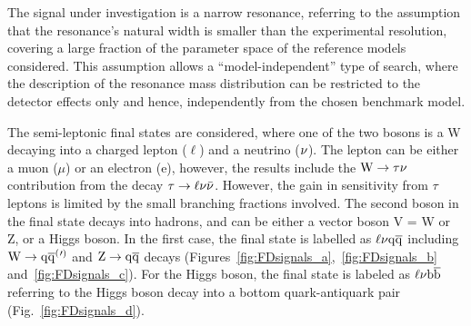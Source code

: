 \begin{table}[!htb]
\centering
\caption{Summary of the properties of the heavy resonance models considered in this work. The polarization of the produced W/Z boson in all considered models is mostly longitudinal.}
\label{tab:models}
\end{table}

The signal under investigation is a narrow resonance, referring to the assumption
that the resonance's natural width is smaller than the experimental resolution, covering a large fraction of the parameter space of the reference models considered.
This assumption allows a ``model-independent'' type of search, where the description of the resonance mass distribution can be restricted to the detector effects only and hence,
independently from the chosen benchmark model.

The semi-leptonic final states are considered, where one of the two bosons is a W decaying into a charged lepton ($\ell$) and a neutrino ($\nu$).
The lepton can be either a muon ($\mu$) or an electron (e), however, the results include the $\mathrm{W}\to\tau\nu$ contribution from the decay $\tau\to\ell\nu\bar{\nu}$.
However, the gain in sensitivity from $\tau$ leptons is limited by the small branching fractions involved.
The second boson in the final state decays into hadrons, and can be either a vector boson V = W or Z,
or a Higgs boson. In the first case, the final state is labelled as $\ell\nu\mathrm{q}\overline{\mathrm{q}}$ including $\mathrm{W}\to\mathrm{q}\overline{\mathrm{q}}^({}'^){}$ and $\mathrm{Z}\to\mathrm{q}\overline{\mathrm{q}}$ decays (Figures~\ref{fig:FDsignals_a},~\ref{fig:FDsignals_b} and~\ref{fig:FDsignals_c}).
For the Higgs boson, the final state is labeled as $\ell\nu{\mathrm{b}\overline{\mathrm{b}}}$ referring to the Higgs boson decay into a bottom quark-antiquark pair (Fig.~\ref{fig:FDsignals_d}).

